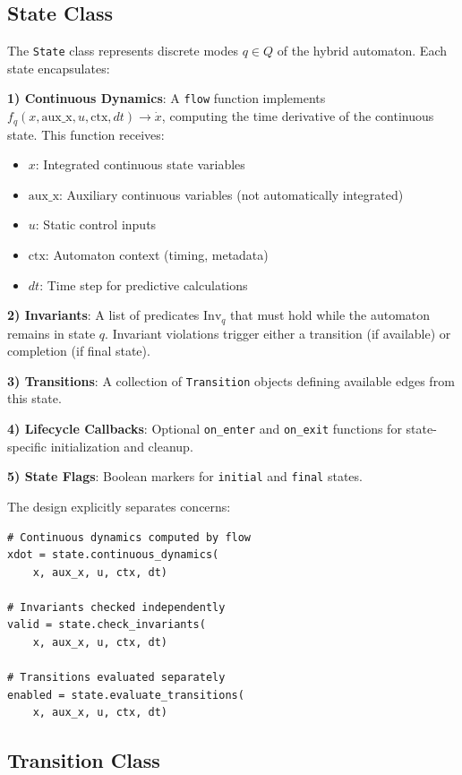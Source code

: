 \documentclass[conference]{IEEEtran}
\begin{document}
\subsection{State Class}

The \texttt{State} class represents discrete modes $q \in Q$ of the hybrid automaton. Each state encapsulates:

\textbf{1) Continuous Dynamics}: A \texttt{flow} function implements $f_q(x, \text{aux\_x}, u, \text{ctx}, dt) \rightarrow \dot{x}$, computing the time derivative of the continuous state. This function receives:
\begin{itemize}
\item $x$: Integrated continuous state variables
\item $\text{aux\_x}$: Auxiliary continuous variables (not automatically integrated)
\item $u$: Static control inputs
\item $\text{ctx}$: Automaton context (timing, metadata)
\item $dt$: Time step for predictive calculations
\end{itemize}

\textbf{2) Invariants}: A list of predicates $\text{Inv}_q$ that must hold while the automaton remains in state $q$. Invariant violations trigger either a transition (if available) or completion (if final state).

\textbf{3) Transitions}: A collection of \texttt{Transition} objects defining available edges from this state.

\textbf{4) Lifecycle Callbacks}: Optional \texttt{on\_enter} and \texttt{on\_exit} functions for state-specific initialization and cleanup.

\textbf{5) State Flags}: Boolean markers for \texttt{initial} and \texttt{final} states.

The design explicitly separates concerns:
\begin{lstlisting}[caption={State Operations}]
# Continuous dynamics computed by flow
xdot = state.continuous_dynamics(
    x, aux_x, u, ctx, dt)

# Invariants checked independently
valid = state.check_invariants(
    x, aux_x, u, ctx, dt)

# Transitions evaluated separately
enabled = state.evaluate_transitions(
    x, aux_x, u, ctx, dt)
\end{lstlisting}

\subsection{Transition Class}
\end{document}

